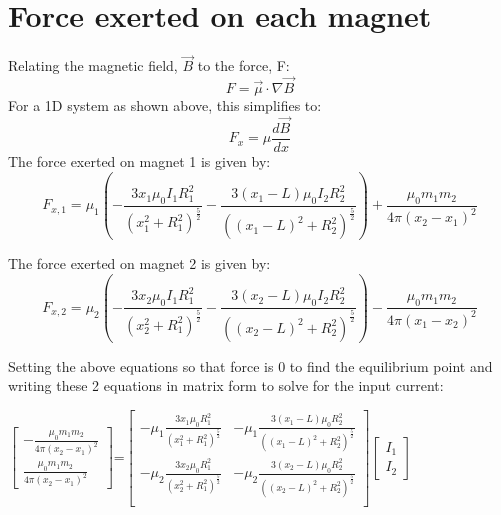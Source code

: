 \documentclass[english]{article}
\begin{document}
%

\section*{Force exerted on each magnet}
Relating the magnetic field, $\vec{B}$ to the force, F:
$$F = \vec{\mu}\cdot\nabla\vec{B}$$  
For a 1D system as shown above, this simplifies to:
$$F_x = \mu\frac{d\vec{B}}{dx}$$
The force exerted on magnet 1 is given by:
$$F_{x,1} = \mu_1\left(-\frac{3 x_1 \mu_0 I_1 R_{1}^{2}}{\left(x_1^2 + R_1^2 \right)^{\frac{5}{2}}} - \frac{3 \left( x_1 - L \right) \mu_0 I_2 R_{2}^{2}}{\left(\left(x_1 - L \right)^2 + R_2^2 \right)^{\frac{5}{2}}} \right) + \frac{\mu_0 m_1 m_2}{4 \pi \left(x_2-x_1\right)^2}$$

The force exerted on magnet 2 is given by:
$$F_{x,2} = \mu_2\left(-\frac{3 x_2 \mu_0 I_1 R_{1}^{2}}{\left(x_2^2 + R_1^2 \right)^{\frac{5}{2}}} - \frac{3 \left( x_2 - L \right) \mu_0 I_2 R_{2}^{2}}{\left(\left(x_2 - L \right)^2 + R_2^2 \right)^{\frac{5}{2}}} \right) - \frac{\mu_0 m_1 m_2}{4 \pi \left(x_1-x_2\right)^2}$$

Setting the above equations so that force is 0 to find the equilibrium point and writing these 2 equations in matrix form to solve for the input current:


\begin{center}
$\begin{bmatrix}
	-\frac{\mu_0 m_1 m_2}{4\pi \left(x_2-x_1\right)^2} \\[0.3em]
	\frac{\mu_0m_1m_2}{4\pi \left(x_2-x_1\right)^2}	
\end{bmatrix}
$=$
\begin{bmatrix}
			-\mu_1\frac{3 x_1 \mu_0 R_{1}^{2}}{\left(x_1^2 + R_1^2 \right)^{\frac{5}{2}}}  & -\mu_1\frac{3 \left( x_1 - L \right) \mu_0 R_{2}^{2}}{\left(\left(x_1 - L \right)^2 + R_2^2 \right)^{\frac{5}{2}}}\\
			-\mu_2\frac{3 x_2 \mu_0 R_{1}^{2}}{\left(x_2^2 + R_1^2 \right)^{\frac{5}{2}}} & -\mu_2\frac{3 \left( x_2 - L \right) \mu_0 R_{2}^{2}}{\left(\left(x_2 - L \right)^2 + R_2^2 \right)^{\frac{5}{2}}}\\
\end{bmatrix}
\begin{bmatrix}
	I_1\\ I_2
\end{bmatrix}
$
\end{center}
\end{document}

